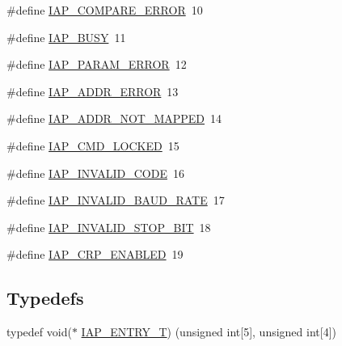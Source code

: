\begin{DoxyCompactItemize}
\#define \hyperlink{group___i_a_p__18_x_x__43_x_x_gabeb57ce3d4009fdee1847f5494376c8d}{I\+A\+P\+\_\+\+C\+O\+M\+P\+A\+R\+E\+\_\+\+E\+R\+R\+OR}~10
\item 
\#define \hyperlink{group___i_a_p__18_x_x__43_x_x_gaa4e308bc310bb68aa8409a6f830aee04}{I\+A\+P\+\_\+\+B\+U\+SY}~11
\item 
\#define \hyperlink{group___i_a_p__18_x_x__43_x_x_ga6bf1bec9cbb419f8006447171e9750b7}{I\+A\+P\+\_\+\+P\+A\+R\+A\+M\+\_\+\+E\+R\+R\+OR}~12
\item 
\#define \hyperlink{group___i_a_p__18_x_x__43_x_x_gaaff51c256373e4a20f8dab1adc1300f3}{I\+A\+P\+\_\+\+A\+D\+D\+R\+\_\+\+E\+R\+R\+OR}~13
\item 
\#define \hyperlink{group___i_a_p__18_x_x__43_x_x_ga4cfd7e0c133c450664f0a60bfbbd9eaa}{I\+A\+P\+\_\+\+A\+D\+D\+R\+\_\+\+N\+O\+T\+\_\+\+M\+A\+P\+P\+ED}~14
\item 
\#define \hyperlink{group___i_a_p__18_x_x__43_x_x_gafdceac1acd5c460094011136c08574a4}{I\+A\+P\+\_\+\+C\+M\+D\+\_\+\+L\+O\+C\+K\+ED}~15
\item 
\#define \hyperlink{group___i_a_p__18_x_x__43_x_x_ga456a8363a47d21d7198056da4b1e9f61}{I\+A\+P\+\_\+\+I\+N\+V\+A\+L\+I\+D\+\_\+\+C\+O\+DE}~16
\item 
\#define \hyperlink{group___i_a_p__18_x_x__43_x_x_ga6913ca0660dc1a2cccd8c6b09bcdbc75}{I\+A\+P\+\_\+\+I\+N\+V\+A\+L\+I\+D\+\_\+\+B\+A\+U\+D\+\_\+\+R\+A\+TE}~17
\item 
\#define \hyperlink{group___i_a_p__18_x_x__43_x_x_ga6c61111082b04ba6780151c83f8c3644}{I\+A\+P\+\_\+\+I\+N\+V\+A\+L\+I\+D\+\_\+\+S\+T\+O\+P\+\_\+\+B\+IT}~18
\item 
\#define \hyperlink{group___i_a_p__18_x_x__43_x_x_gaaccc191ce402e19b0c0ae399f614efe8}{I\+A\+P\+\_\+\+C\+R\+P\+\_\+\+E\+N\+A\+B\+L\+ED}~19
\end{DoxyCompactItemize}
\subsection*{Typedefs}
\begin{DoxyCompactItemize}
\item 
typedef void($\ast$ \hyperlink{group___i_a_p__18_x_x__43_x_x_ga07176e9ce6963e57318fa8c127b4f611}{I\+A\+P\+\_\+\+E\+N\+T\+R\+Y\+\_\+T}) (unsigned int\mbox{[}5\mbox{]}, unsigned int\mbox{[}4\mbox{]})
\end{DoxyCompactItemize}
